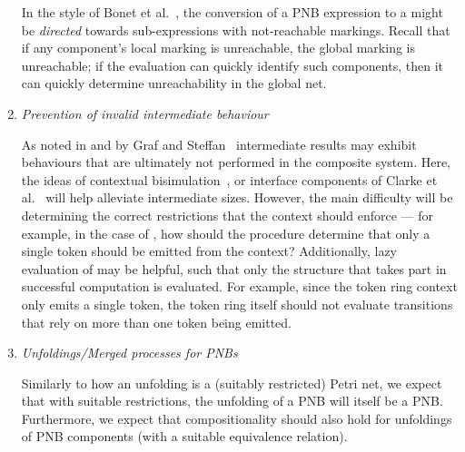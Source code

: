 \begin{enumerate}[leftmargin=*]
        In the style of {Bonet et al.}~\cite{Bonet2008}, the conversion of a
        PNB expression to a \TNFA{} might be \emph{directed} towards
        sub-expressions with not-reachable markings. Recall that if any
        component's local marking is unreachable, the global marking is
        unreachable; if the evaluation can quickly identify such components,
        then it can quickly determine unreachability in the global net.

    \item \emph{Prevention of invalid intermediate behaviour}

        As noted in  and by {Graf and
        Steffan}~\cite{Graf1990} intermediate results may exhibit behaviours
        that are ultimately not performed in the composite system. Here, the
        ideas of contextual bisimulation~\cite{Larsen1987}, or interface
        components of {Clarke et al.}~\cite{Clarke1989} will help alleviate
        intermediate \TNFA{} sizes. However, the main difficulty will be
        determining the correct restrictions that the context should enforce
        --- for example, in the case of \tokenringSys{-}, how should the
        procedure determine that only a single token should be emitted from the
        context? Additionally, lazy evaluation of \TNFA{} may be helpful, such
        that only the structure that takes part in successful computation is
        evaluated. For example, since the token ring context only emits a
        single token, the token ring itself should not evaluate transitions
        that rely on more than one token being emitted.

\item \emph{Unfoldings/Merged processes for PNBs}
        \newcommand{\compl}[1]{\bar #1}

        Similarly to how an unfolding is a (suitably restricted) Petri net, we
        expect that with suitable restrictions, the unfolding of a PNB will
        itself be a PNB. Furthermore, we expect that compositionality should
        also hold for unfoldings of PNB components (with a suitable equivalence
        relation).


\end{enumerate}
